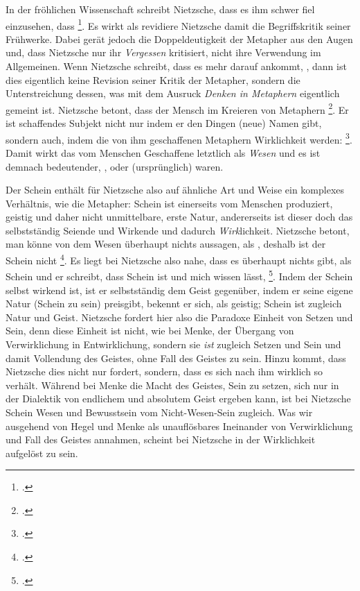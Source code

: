 \documentclass[12pt, a4paper, openany]{report}
\begin{document}
In der fröhlichen Wissenschaft schreibt Nietzsche, dass es ihm schwer fiel einzusehen, dass \footcite[][422]{nietzsche_morgenrote_1999}.
Es wirkt als revidiere Nietzsche damit die Begriffskritik seiner Frühwerke.
Dabei gerät jedoch die Doppeldeutigkeit der Metapher aus den Augen und, dass Nietzsche nur ihr \emph{Vergessen} kritisiert, nicht ihre Verwendung im Allgemeinen. 
Wenn Nietzsche schreibt, dass es mehr darauf ankommt, , dann ist dies eigentlich keine Revision seiner Kritik der Metapher, sondern die Unterstreichung dessen, was mit dem Ausruck \emph{Denken in Metaphern} eigentlich gemeint ist.
Nietzsche betont, dass der Mensch im Kreieren von Metaphern \footcite[][883]{nietzsche_geburt_1999}.
Er ist schaffendes Subjekt nicht nur indem er den Dingen (neue) Namen gibt, sondern auch, indem die von ihm geschaffenen Metaphern Wirklichkeit werden: 
\footcite[][422]{nietzsche_morgenrote_1999}.
Damit wirkt das vom Menschen Geschaffene letztlich als \emph{Wesen} und es ist demnach bedeutender, , oder (ursprünglich) waren.

Der Schein enthält für Nietzsche also auf ähnliche Art und Weise ein komplexes Verhältnis, wie die Metapher: 
Schein ist einerseits vom Menschen produziert, geistig und daher nicht unmittelbare, erste Natur, andererseits ist dieser doch das selbstständig Seiende und Wirkende und dadurch \emph{Wirk}lichkeit.
Nietzsche betont, man könne von dem Wesen überhaupt nichts aussagen, als , deshalb ist der Schein nicht \footcite[][417]{nietzsche_geburt_1999}.
Es liegt bei Nietzsche also nahe, dass es überhaupt nichts gibt, als Schein und er schreibt, dass Schein  ist und mich wissen lässt, \footcite[][417]{nietzsche_morgenrote_1999}.
Indem der Schein selbst wirkend ist, ist er selbstständig dem Geist gegenüber, indem er seine eigene Natur (Schein zu sein) preisgibt, bekennt er sich, als geistig;
Schein ist zugleich Natur und Geist.
Nietzsche fordert hier also die Paradoxe Einheit von Setzen und Sein, denn diese Einheit ist nicht, wie bei Menke, der Übergang von Verwirklichung in Entwirklichung, sondern sie \emph{ist} zugleich Setzen und Sein und damit Vollendung des Geistes, ohne Fall des Geistes zu sein.
Hinzu kommt, dass Nietzsche dies nicht nur fordert, sondern, dass es sich nach ihm wirklich so verhält.
Während bei Menke die Macht des Geistes, Sein zu setzen, sich nur in der Dialektik von endlichem und absolutem Geist ergeben kann,
ist bei Nietzsche Schein Wesen und Bewusstsein vom Nicht-Wesen-Sein zugleich.
Was wir ausgehend von Hegel und Menke als unauflösbares Ineinander von Verwirklichung und Fall des Geistes annahmen, scheint bei Nietzsche in der Wirklichkeit aufgelöst zu sein. \\
\end{document}
